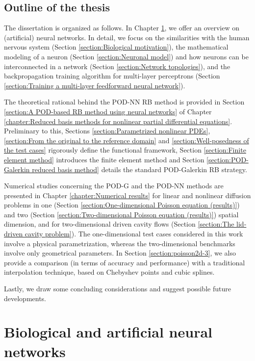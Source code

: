 \documentclass[12pt, a4paper, twoside, openright, notitlepage]{report}
\numberwithin{equation}{chapter}
\theoremstyle{theorem}
\theoremstyle{definition}
\theoremstyle{remark}
\theoremstyle{proposition}
\numberwithin{figure}{chapter}
\begin{document}
		\clearpage
		
		\section*{Outline of the thesis}
		
		The dissertation is organized as follows. In Chapter \ref{chapter:Introduction to neural networks}, we offer an overview on (artificial) neural networks. In detail, we focus on the similarities with the human nervous system (Section \ref{section:Biological motivation}), the mathematical modeling of a neuron (Section \ref{section:Neuronal model}) and how neurons can be interconnected in a network (Section \ref{section:Network topologies}), and the backpropagation training algorithm for multi-layer perceptrons (Section \ref{section:Training a multi-layer feedforward neural network}). 
		
		The theoretical rational behind the POD-NN RB method is provided in Section \ref{section:A POD-based RB method using neural networks} of Chapter \ref{chapter:Reduced basis methods for nonlinear partial differential equations}. Preliminary to this, Sections \ref{section:Parametrized nonlinear PDEs}, \ref{section:From the original to the reference domain} and \ref{section:Well-posedness of the test cases} rigorously define the functional framework, Section \ref{section:Finite element method} introduces the finite element method and Section \ref{section:POD-Galerkin reduced basis method} details the standard POD-Galerkin RB strategy. 
		
		Numerical studies concerning the POD-G and the POD-NN methods are presented in Chapter \ref{chapter:Numerical results} for linear and nonlinear diffusion problems in one (Section \ref{section:One-dimensional Poisson equation (results)}) and two (Section \ref{section:Two-dimensional Poisson equation (results)}) spatial dimension, and for two-dimensional driven cavity flows (Section \ref{section:The lid-driven cavity problem}). The one-dimensional test cases considered in this work involve a physical parametrization, whereas the two-dimensional benchmarks involve only geometrical parameters. In Section \ref{section:poisson2d-3}, we also provide a comparison (in terms of accuracy and performance) with a traditional interpolation technique, based on Chebyshev points and cubic splines.
		
		Lastly, we draw some concluding considerations and suggest possible future developments.
		
				
	\chapter{Biological and artificial neural networks}
	\label{chapter:Introduction to neural networks}
	
\end{document}
